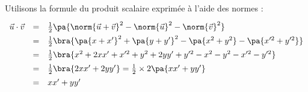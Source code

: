 \begin{demo}
\begin{enumerate}
		      Utilisons la formule du produit scalaire exprimée à l'aide des normes :
		      \[
			      \def\arraystretch{1.4}
			      \begin{array}{rcl}
				      \vec{u}\cdot\vec{v} & = & \frac{1}{2}\pa{\norm{\vec{u} + \vec{v}}^2 - \norm{\vec{u}}^2 - \norm{\vec{v}}^2}   \\
				                          & = & \frac{1}{2}\bra{\pa{x + x'}^2 + \pa{y + y'}^2 - \pa{x^2 + y^2} - \pa{x'^2 + y'^2}} \\
				                          & = & \frac{1}{2}\bra{x^2 + 2xx' + x'^2 + y^2 + 2yy' + y'^2 - x^2 - y^2 - x'^2 - y'^2}   \\
				                          & = & \frac{1}{2}\bra{2xx' + 2yy'} = \frac{1}{2} \times 2 \pa{xx' + yy'}                 \\
				                          & = & xx' + yy'
			      \end{array}
		      \]
	\end{enumerate}
\end{demo}

